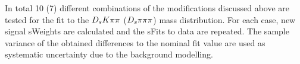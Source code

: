 %
%
%
%
%
%

In total 10 (7) different combinations of the modifications discussed above are tested for the fit to the ${{D}_{s}} {K} {\pi}{\pi}$ (${{D}_{s}} \pi {\ensuremath{\pi}}{\ensuremath{\pi}}$) mass distribution.
For each case, new signal \textsf{sWeights} are calculated and the \textsf{sFits} to data are repeated. 
The sample variance of the obtained differences to the nominal fit value are used as systematic uncertainty due to the background modelling.

